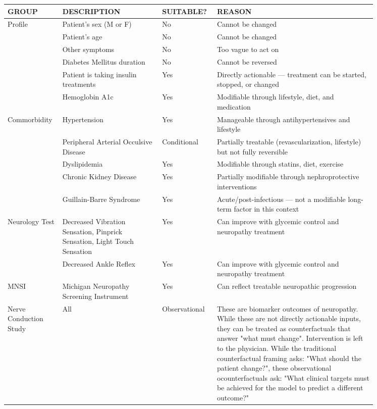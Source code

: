 \documentclass[fleqn,10pt]{wlscirep}
\begin{document}
\begin{table}[h!]
\centering
\footnotesize
\begin{tabular}{p{0.1\linewidth} p{0.25\linewidth} p{0.1\linewidth} p{0.4\linewidth}}
\toprule
GROUP &  DESCRIPTION & SUITABLE? & REASON \\
\midrule
Profile      & Patient's sex (M or F) & No & Cannot be changed \\
             & Patient's age & No & Cannot be changed \\
             & Other symptoms & No & Too vague to act on \\
             & Diabetes Mellitus duration & No & Cannot be reversed \\
             & Patient is taking insulin treatments & Yes & Directly actionable — treatment can be started, stopped, or changed \\
             & Hemoglobin A1c & Yes & Modifiable through lifestyle, diet, and medication \\
\midrule
Commorbidity & Hypertension & Yes & Manageable through antihypertensives and lifestyle \\
             & Peripheral Arterial Occulsive Disease & Conditional & Partially treatable (revascularization, lifestyle) but not fully reversible \\
             & Dyslipidemia & Yes & Modifiable through statins, diet, exercise\\
             & Chronic Kidney Disease & Yes & Partially modifiable through nephroprotective interventions \\
             & Guillain-Barre Syndrome & Yes & Acute/post-infectious — not a modifiable long-term factor in this context \\
\midrule
Neurology \newline Test   & Decreased Vibration Sensation, Pinprick Sensation, Light Touch Sensation & Yes &  Can improve with glycemic control and neuropathy treatment \\
                 & Decreased Ankle Reflex & Yes &  Can improve with glycemic control and neuropathy treatment \\
\midrule
MNSI            & Michigan Neuropathy Screening Instrument & Yes & Can reflect treatable neuropathic progression \\
\midrule
Nerve \newline Conduction \newline Study   & All & Observational & These are biomarker outcomes of neuropathy. While these are not directly actionable inputs, they can be treated as counterfactuals that answer "what must change". Intervention is left to the physician. While the traditional counterfactual framing asks: "What should the patient change?", these observational ocounterfactuals ask: "What clinical targets must be achieved for the model to predict a different outcome?"\\

\end{tabular}
\end{table}
\end{document}
